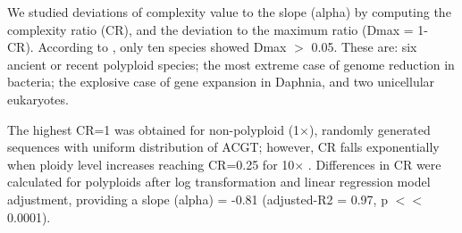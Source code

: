 We studied deviations of complexity value to the slope (alpha) by computing the complexity ratio (CR), and the deviation to the maximum ratio (Dmax = 1- CR). According to , only ten species showed Dmax $>$ 0.05. These are: six ancient or recent polyploid species; the most extreme case of genome reduction in bacteria; the explosive case of gene expansion in Daphnia, and two unicellular eukaryotes.

The highest CR=1 was obtained for non-polyploid (1$\times$), randomly generated sequences with uniform distribution of ACGT; however, CR falls exponentially when ploidy level increases reaching CR=0.25 for 10$\times$ . Differences in CR were calculated for polyploids after log transformation and linear regression model adjustment, providing a slope (alpha) = -0.81 (adjusted-R2 = 0.97, p $<<$ 0.0001). 

\begin{table}[htbp]
\caption[Human language Complexity]{\textbf{Human language Complexity}\\
Work length (L), complexity (C), complexity ratio (CR), and deviations from the maximum ratio of complexity (Dmax=1- CR) for 11 human writings in six different languages. Features: SA: Scientific abstract, SS: Short story; B: Book, CW: Complete Work
}
\label{tab:book_compl}
\end{table}

